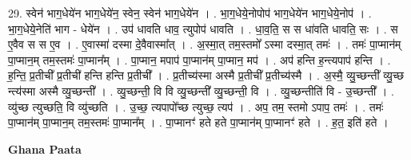 \documentclass[17pt]{extarticle}
\begin{document}
29. स्वेन॑ भाग॒धेये॑न भाग॒धेये॑न॒ स्वेन॒ स्वेन॑ भाग॒धेये॑न । . भा॒ग॒धेये॒नोपोप॑ भाग॒धेये॑न भाग॒धेये॒नोप॑ । . भा॒ग॒धेये॒नेति॑ भाग - धेये॑न । . उप॑ धावति धाव॒ त्युपोप॑ धावति । . धा॒व॒ति॒ स स धा॑वति धावति॒ सः । . स ए॒वैव स स ए॒व । . ए॒वास्मा॑ दस्मा दे॒वैवास्मा᳚त् । . अ॒स्मा॒त् तम॒स्तमो᳚ ऽस्मा दस्मा॒त् तमः॑ । . तमः॑ पा॒प्मान॑म् पा॒प्मान॒म् तम॒स्तमः॑ पा॒प्मान᳚म् । . पा॒प्मान॒ मपाप॑ पा॒प्मान॑म् पा॒प्मान॒ मप॑ । . अप॑ हन्ति ह॒न्त्यपाप॑ हन्ति । . ह॒न्ति॒ प्र॒तीची᳚ प्र॒तीची॑ हन्ति हन्ति प्र॒तीची᳚ । . प्र॒तीच्य॑स्मा अस्मै प्र॒तीची᳚ प्र॒तीच्य॑स्मै । . अ॒स्मै॒ व्यु॒च्छन्ती᳚ व्यु॒च्छ न्त्य॑स्मा अस्मै व्यु॒च्छन्ती᳚ । . व्यु॒च्छन्ती॒ वि वि व्यु॒च्छन्ती᳚ व्यु॒च्छन्ती॒ वि । . व्यु॒च्छन्तीति॑ वि - उ॒च्छन्ती᳚ । . व्यु॑च्छ त्युच्छति॒ वि व्यु॑च्छति । . उ॒च्छ॒ त्यपापो᳚च्छ त्युच्छ॒ त्यप॑ । . अप॒ तम॒ स्तमो ऽपाप॒ तमः॑ । . तमः॑ पा॒प्मान॑म् पा॒प्मान॒म् तम॒स्तमः॑ पा॒प्मान᳚म् । . पा॒प्मानꣳ॑ हते हते पा॒प्मान॑म् पा॒प्मानꣳ॑ हते । . ह॒त॒ इति॑ हते । \newline

\textbf{Ghana Paata } \newline
\end{document}
